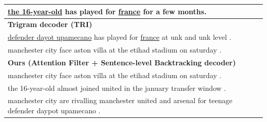 \begin{table}[th!]
\begin{center}
\begin{tabular}{|l|}
\underline{the 16-year-old} has played for \underline{france}  for a few months.\\ 
\hline \bf Trigram decoder (TRI) \\
\hline \underline{defender dayot upamecano} has played for \underline{france} at unk and unk level .\\ 
       manchester city face aston villa at the etihad stadium on saturday . \\
\hline \bf Ours (Attention Filter + Sentence-level Backtracking decoder) \\
\hline manchester city face aston villa at the etihad stadium on saturday . \\
       the 16-year-old almost joined united in the january transfer window . \\
	   manchester city are rivalling manchester united and arsenal for teenage defender daypot upamecano .\\
\hline
\end{tabular}
\end{center}
\end{table}


